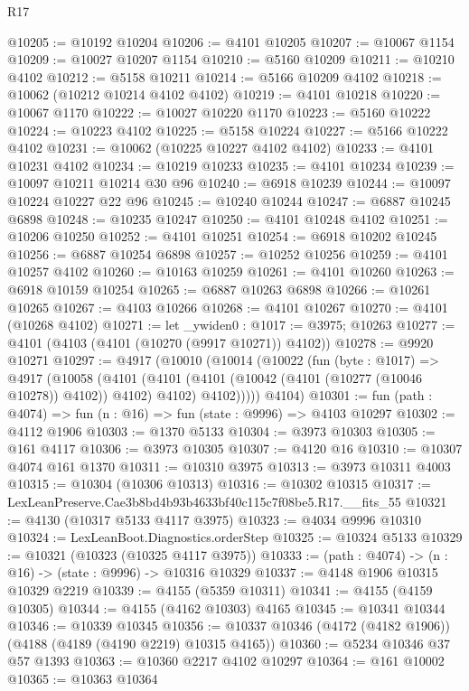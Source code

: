 \begin{lexlean}{R17}
\begin{coremodule}
@10205 := @10192 @10204
@10206 := @4101 @10205
@10207 := @10067 @1154
@10209 := @10027 @10207 @1154
@10210 := @5160 @10209
@10211 := @10210 @4102
@10212 := @5158 @10211
@10214 := @5166 @10209 @4102
@10218 := @10062 (@10212 @10214 @4102 @4102)
@10219 := @4101 @10218
@10220 := @10067 @1170
@10222 := @10027 @10220 @1170
@10223 := @5160 @10222
@10224 := @10223 @4102
@10225 := @5158 @10224
@10227 := @5166 @10222 @4102
@10231 := @10062 (@10225 @10227 @4102 @4102)
@10233 := @4101 @10231 @4102
@10234 := @10219 @10233
@10235 := @4101 @10234
@10239 := @10097 @10211 @10214 @30 @96
@10240 := @6918 @10239
@10244 := @10097 @10224 @10227 @22 @96
@10245 := @10240 @10244
@10247 := @6887 @10245 @6898
@10248 := @10235 @10247
@10250 := @4101 @10248 @4102
@10251 := @10206 @10250
@10252 := @4101 @10251
@10254 := @6918 @10202 @10245
@10256 := @6887 @10254 @6898
@10257 := @10252 @10256
@10259 := @4101 @10257 @4102
@10260 := @10163 @10259
@10261 := @4101 @10260
@10263 := @6918 @10159 @10254
@10265 := @6887 @10263 @6898
@10266 := @10261 @10265
@10267 := @4103 @10266
@10268 := @4101 @10267
@10270 := @4101 (@10268 @4102)
@10271 := let _ywiden0 : @1017 := @3975; @10263
@10277 := @4101 (@4103 (@4101 (@10270 (@9917 @10271)) @4102))
@10278 := @9920 @10271
@10297 := @4917
    (@10010
      (@10014
        (@10022
          (fun (byte : @1017) =>
          @4917
            (@10058
              (@4101
                (@4101 (@4101 (@10042 (@4101 (@10277 (@10046 @10278)) @4102)) @4102) @4102)
                @4102)))))
      @4104)
@10301 := fun (path : @4074) => fun (n : @16) => fun (state : @9996) => @4103 @10297
@10302 := @4112 @1906
@10303 := @1370 @5133
@10304 := @3973 @10303
@10305 := @161 @4117
@10306 := @3973 @10305
@10307 := @4120 @16
@10310 := @10307 @4074 @161 @1370
@10311 := @10310 @3975
@10313 := @3973 @10311 @4003
@10315 := @10304 (@10306 @10313)
@10316 := @10302 @10315
@10317 := LexLeanPreserve.Cae3b8bd4b93b4633bf40c115c7f08be5.R17.__fits_55
@10321 := @4130 (@10317 @5133 @4117 @3975)
@10323 := @4034 @9996 @10310
@10324 := LexLeanBoot.Diagnostics.orderStep
@10325 := @10324 @5133
@10329 := @10321 (@10323 (@10325 @4117 @3975))
@10333 := (path : @4074) -> (n : @16) -> (state : @9996) -> @10316 @10329
@10337 := @4148 @1906 @10315 @10329 @2219
@10339 := @4155 (@5359 @10311)
@10341 := @4155 (@4159 @10305)
@10344 := @4155 (@4162 @10303) @4165
@10345 := @10341 @10344
@10346 := @10339 @10345
@10356 := @10337 @10346 (@4172 (@4182 @1906)) (@4188 (@4189 (@4190 @2219) @10315 @4165))
@10360 := @5234 @10346 @37 @57 @1393
@10363 := @10360 @2217 @4102 @10297
@10364 := @161 @10002
@10365 := @10363 @10364

\end{coremodule}
\end{lexlean}
